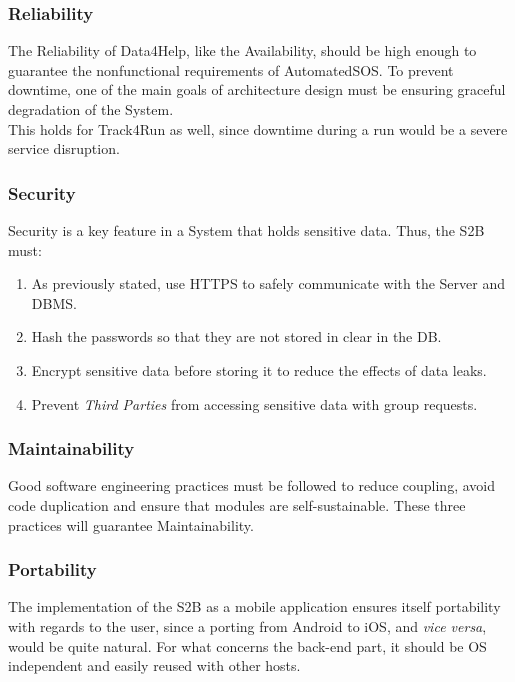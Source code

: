 \documentclass[titlepage]{article}
\begin{document}
			\subsubsection{Reliability}
			The Reliability of Data4Help, like the Availability, should be high enough to guarantee the nonfunctional 				requirements of AutomatedSOS. To prevent downtime, one of the main goals of architecture design must be 			ensuring graceful degradation of the System.\\
			This holds for Track4Run as well, since downtime during a run would be a severe service disruption.\\
			\subsubsection{Security}
			Security is a key feature in a System that holds sensitive data. Thus, the S2B must:
			\begin{enumerate}
				\item As previously stated, use HTTPS to safely communicate with the Server and DBMS.
				\item Hash the passwords so that they are not stored in clear in the DB.
				\item Encrypt sensitive data before storing it to reduce the effects of data leaks.
				\item Prevent {\it Third Parties} from accessing sensitive data with group requests.
			\end{enumerate}
			\subsubsection{Maintainability}
			Good software engineering practices must be followed to reduce coupling, avoid code duplication and ensure 			that modules are self-sustainable. These three practices will guarantee Maintainability.\\
			\subsubsection{Portability}
			The implementation of the S2B as a mobile application ensures itself portability with regards to the user, since 			a porting from Android to iOS, and {\it vice versa}, would be quite natural. For what concerns the back-end 			part, it should be OS independent and easily reused with other hosts. \\
	
	\pagebreak	
		
\end{document}
